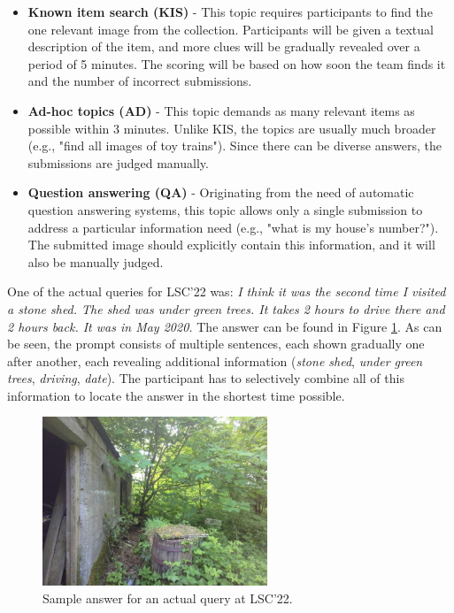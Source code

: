 \begin{itemize}
    \item \textbf{Known item search (KIS)} - This topic requires participants to find the one relevant image from the collection. Participants will be given a textual description of the item, and more clues will be gradually revealed over a period of 5 minutes. The scoring will be based on how soon the team finds it and the number of incorrect submissions. 
    \item \textbf{Ad-hoc topics (AD)} - This topic demands as many relevant items as possible within 3 minutes. Unlike KIS, the topics are usually much broader (e.g., "find all images of toy trains"). Since there can be diverse answers, the submissions are judged manually.
    \item \textbf{Question answering (QA)} - Originating from the need of automatic question answering systems, this topic allows only a single submission to address a particular information need (e.g., "what is my house's number?"). The submitted image should explicitly contain this information, and it will also be manually judged.
\end{itemize}

One of the actual queries for LSC'22 was: \textit{I think it was the second time I visited a stone shed. The shed was under green trees. It takes 2 hours to drive there and 2 hours back. It was in May 2020.} The answer can be found in Figure \ref{fig:LSCsample}. As can be seen, the prompt consists of multiple sentences, each shown gradually one after another, each revealing additional information (\textit{stone shed}, \textit{under green trees}, \textit{driving}, \textit{date}). The participant has to selectively combine all of this information to locate the answer in the shortest time possible.

\begin{figure}[h]
    \centering
    \includegraphics[width=0.6\textwidth]{content/resources/images/evaluation/LSCsample.jpg}
    \caption{Sample answer for an actual query at LSC'22.}
    \label{fig:LSCsample}
\end{figure}

